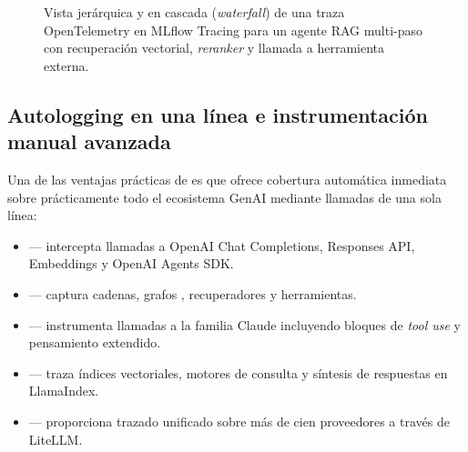 \begin{figure}[htbp]
{%
}
\caption{Vista jerárquica y en cascada (\textit{waterfall}) de una traza OpenTelemetry en MLflow Tracing para un agente RAG multi-paso con recuperación vectorial, \textit{reranker} y llamada a herramienta externa.}
\label{fig:mlflow-trace-waterfall}
\end{figure}

\subsection{Autologging en una línea e instrumentación manual avanzada}\label{subsec:tracing-codigo}

Una de las ventajas prácticas de  es que ofrece cobertura automática inmediata sobre prácticamente todo el ecosistema GenAI mediante llamadas  de una sola línea:

\begin{itemize}
  \item {} --- intercepta llamadas a OpenAI Chat Completions, Responses API, Embeddings y OpenAI Agents SDK.
  \item {} --- captura cadenas, grafos , recuperadores y herramientas.
  \item {} --- instrumenta llamadas a la familia Claude incluyendo bloques de \textit{tool use} y pensamiento extendido.
  \item {} --- traza índices vectoriales, motores de consulta y síntesis de respuestas en LlamaIndex.
  \item {} --- proporciona trazado unificado sobre más de cien proveedores a través de LiteLLM.
\end{itemize}


